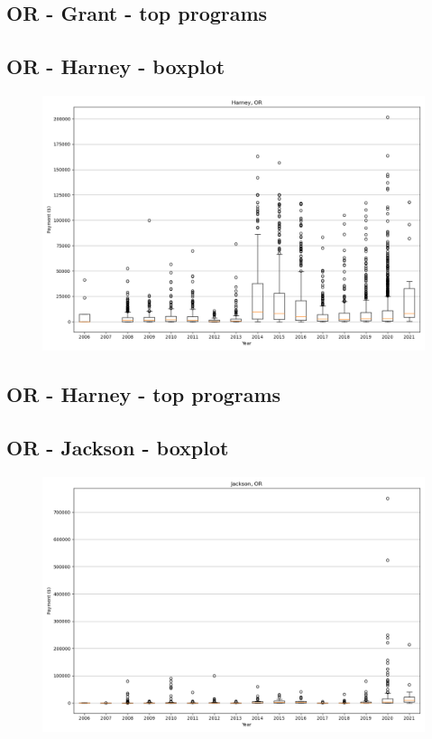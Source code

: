 \subsection*{OR - Grant - top programs}

\newpage
\subsection*{OR - Harney - boxplot}
\begin{figure}[h]
\centering
\includegraphics[width=7in]{../output/boxplots/counties/Harney-OR_boxplot.png}
\end{figure}


\subsection*{OR - Harney - top programs}

\newpage
\subsection*{OR - Jackson - boxplot}
\begin{figure}[h]
\centering
\includegraphics[width=7in]{../output/boxplots/counties/Jackson-OR_boxplot.png}
\end{figure}


